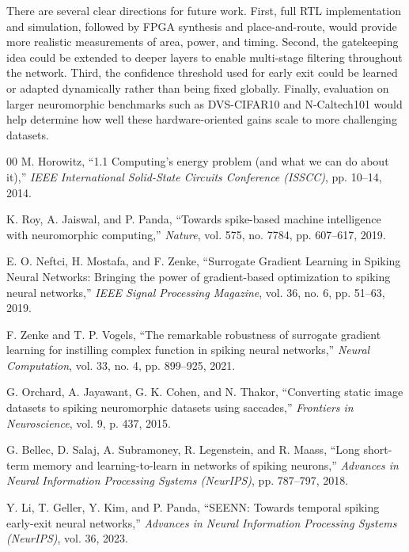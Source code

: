\documentclass[conference]{IEEEtran}
\begin{document}
There are several clear directions for future work. First, full RTL implementation and simulation, followed by FPGA synthesis and place-and-route, would provide more realistic measurements of area, power, and timing. Second, the gatekeeping idea could be extended to deeper layers to enable multi-stage filtering throughout the network. Third, the confidence threshold used for early exit could be learned or adapted dynamically rather than being fixed globally. Finally, evaluation on larger neuromorphic benchmarks such as DVS-CIFAR10 and N-Caltech101 would help determine how well these hardware-oriented gains scale to more challenging datasets.

\begin{thebibliography}{00}
M. Horowitz,
``1.1 Computing's energy problem (and what we can do about it),''
\textit{IEEE International Solid-State Circuits Conference (ISSCC)}, pp. 10--14, 2014.

K. Roy, A. Jaiswal, and P. Panda,
``Towards spike-based machine intelligence with neuromorphic computing,''
\textit{Nature}, vol. 575, no. 7784, pp. 607--617, 2019.

E. O. Neftci, H. Mostafa, and F. Zenke,
``Surrogate Gradient Learning in Spiking Neural Networks: Bringing the power of gradient-based optimization to spiking neural networks,''
\textit{IEEE Signal Processing Magazine}, vol. 36, no. 6, pp. 51--63, 2019.

F. Zenke and T. P. Vogels,
``The remarkable robustness of surrogate gradient learning for instilling complex function in spiking neural networks,''
\textit{Neural Computation}, vol. 33, no. 4, pp. 899--925, 2021.

G. Orchard, A. Jayawant, G. K. Cohen, and N. Thakor,
``Converting static image datasets to spiking neuromorphic datasets using saccades,''
\textit{Frontiers in Neuroscience}, vol. 9, p. 437, 2015.

G. Bellec, D. Salaj, A. Subramoney, R. Legenstein, and R. Maass,
``Long short-term memory and learning-to-learn in networks of spiking neurons,''
\textit{Advances in Neural Information Processing Systems (NeurIPS)}, pp. 787--797, 2018.

Y. Li, T. Geller, Y. Kim, and P. Panda,
``SEENN: Towards temporal spiking early-exit neural networks,''
\textit{Advances in Neural Information Processing Systems (NeurIPS)}, vol. 36, 2023.
\end{thebibliography}
\end{document}
